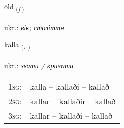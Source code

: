 \documentclass[frontgrid, backgrid]{flacards}\usepackage[]{graphicx}\usepackage[]{xcolor}
\begin{document}
\renewcommand{\blhead}{\vskip5pt {\small\bfseries\footnotesize Nafnorð | іменник }}
\renewcommand{\bcfoot}{\vskip5pt \hspace{2pt}{\small\bfseries\footnotesize 1K}}


{öld \small{\textsubscript{(\textit{f.})}} \\[1ex] %
\textphonetic{[œlt]} \\
ukr.: \emph{вік; століття} \\  [2ex]
\renewcommand*{\arraystretch}{0.8}
}

\renewcommand{\flhead}{\vskip5pt \fboxsep=0pt {\small\bfseries\footnotesize Sagnorð | дієслово}}
\renewcommand{\fcfoot}{\vskip5pt \fboxsep=0pt \hspace{2pt}{\small\bfseries\footnotesize 1K}}

\renewcommand{\blhead}{\vskip5pt {\small\bfseries\footnotesize Sagnorð | дієслово }}
\renewcommand{\bcfoot}{\vskip5pt \hspace{2pt}{\small\bfseries\footnotesize 1K}}


{kalla \small{\textsubscript{(\textit{v.})}} \\[1ex] %
\textphonetic{[kʰatla]} \\
ukr.: \emph{звати / кричати} \\  [2ex]
\renewcommand*{\arraystretch}{0.8}
\begin{tabular}{p{1cm}l}
\textsc{1sg}: & kalla -- kallaði -- kallað \\ 
\textsc{2sg}: & kallar -- kallaðir -- kallað \\ 
\textsc{3sg}: & kallar -- kallaði -- kallað \\ 
\end{tabular}
}

\renewcommand{\flhead}{\vskip5pt \fboxsep=0pt {\small\bfseries\footnotesize Nafnorð | іменник}}
\renewcommand{\fcfoot}{\vskip5pt \fboxsep=0pt \hspace{2pt}{\small\bfseries\footnotesize 1K}}
\end{document}
